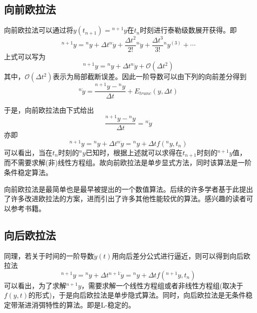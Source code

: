 \subsection{向前欧拉法}
向前欧拉法可以通过将$y(t_{n+1})={^{n+1}\!y}$在$t_n$时刻进行泰勒级数展开获得。即
\begin{equation}
{^{n+1}\!y}={^{n}\!y}+\Delta t{^n\!\dot{y}}+\frac{\Delta t^2}{2!}{^n\!\ddot{y}}+\frac{\Delta t^3}{3!}{^n\!y^{(3)}}+\cdots
\end{equation}
上式可以写为
\begin{equation}
{^{n+1}\!y}={^{n}\!y}+\Delta t{^n\!\dot{y}}+\mathcal{O}(\Delta t^2)
\end{equation}
其中，$\mathcal{O}(\Delta t^2)$表示为局部截断误差。因此一阶导数可以由下列的向前差分得到
\begin{equation}
{^n\!\dot{y}}=\frac{{^{n+1}\!y}-{^n\!y}}{\Delta t}+E_{trunc}(y,\Delta t)
\end{equation}

于是，向前欧拉法由下式给出
\begin{equation}
\frac{{^{n+1}\!y}-{^n\!y}}{\Delta t}={^n\!\dot{y}}
\end{equation}
亦即
\begin{equation}
{^{n+1}\!y}={^n\!y}+\Delta t{^n\!\dot{y}}={^n\!y}+\Delta tf({^n\!y},t_n)
\end{equation}
可以看出，当在$t_n$时刻的${^n\!y}$已知时，根据上述就可以求得在$t_{n+1}$时刻的${^{n+1}\!y}$值，而不需要求解(非)线性方程组。故向前欧拉法是单步显式方法，同时该算法是一阶条件稳定算法。

向前欧拉法是最简单也是最早被提出的一个数值算法。后续的许多学者基于此提出了许多改进欧拉法的方案，进而引出了许多其他性能较优的算法。感兴趣的读者可以参考书籍。
\subsection{向后欧拉法}
同理，若关于时间的一阶导数$\dot{y}(t)$用向后差分公式进行逼近，则可以得到向后欧拉法
\begin{equation}
{^{n+1}\!y}={^n\!y}+\Delta t{^{n+1}\!\dot{y}}={^n\!y}+\Delta tf({^{n+1}\!y},t_n)
\end{equation}
可以看出，为了求解${^{n+1}\!y}$，需要求解一个线性方程组或者非线性方程组(取决于$f(y,t)$的形式)，于是向后欧拉法是单步隐式算法。同时，向后欧拉法是无条件稳定带渐进消弭特性的算法。即是L-稳定的。
